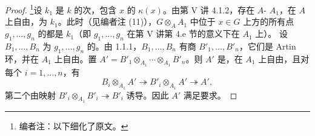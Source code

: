 \begin{proof}
\footnote{编者注：以下细化了原文。}设 $k_1$ 是 $k$ 的次，包含 $x$ 的 $\kappa(x)$。由第 V 讲 4.1.2，存在 $A$- $A_1$，在 $A$ 上自由，为 $k_1$。此时（见编者注 (11)），$G\otimes_A A_1$ 中位于 $x\in G$ 上方的所有点 $g_1,\ldots,g_n$ 的都是 $k_1$（即 $g_1,\ldots,g_n$ 在第 V 讲第 4.e 节的意义下在 $A_1$ 上）。
设 $B_1,\ldots,B_n$ 为 $g_1,\ldots,g_n$ 的。由 1.1.1，$B_1,\ldots,B_n$ 有商 $B'_1,\ldots,B'_n$，它们是 Artin 环，并在 $A_1$ 上自由。置 $A'=B'_1\otimes_{A_1}\cdots\otimes_{A_1}B'_n$。则 $A'$ 是，在 $A_1$ 上自由，且对每个 $i=1,\ldots,n$，有
\[
B_i\otimes_{A_1}A'\twoheadrightarrow B'_i\otimes_{A_1}A'\twoheadrightarrow A',
\]
第二个由映射 $B'_i\otimes_{A_1}B'_i\twoheadrightarrow B'_i$ 诱导。因此 $A'$ 满足要求。
\end{proof}

